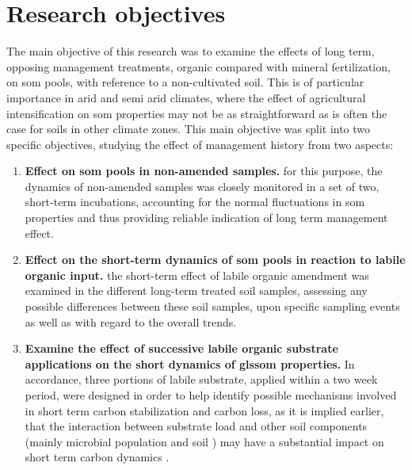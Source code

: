 \section{Research objectives}

	The main objective of this research was to examine the effects of long term, opposing management treatments, organic compared with mineral fertilization, on \gls{som} pools,  with reference to a non-cultivated soil. This is of particular importance in arid and semi arid climates, where the effect of agricultural intensification on \gls{som} properties may not be as straightforward as is often the case for soils in other climate zones.
	This main objective was split into two specific objectives, studying the effect of management history from two aspects:
	\begin{enumerate}
		\item \textbf{Effect on \gls{som} pools in non-amended samples.} for this purpose, the dynamics of non-amended samples was closely monitored in a set of two, short-term incubations, accounting for the normal fluctuations in \gls{som} properties and thus providing reliable indication of long term management effect.
		\item \textbf{Effect on the short-term dynamics of \gls{som} pools in reaction to labile organic input.} the short-term effect of labile organic amendment was examined in the different long-term treated soil samples, assessing any possible differences between these soil samples, upon specific sampling events as well as with regard to the overall trends.


		\item \textbf{Examine the effect of successive labile organic substrate applications on the short dynamics of gls{som} properties.} In accordance, three portions of labile substrate, applied within a two week period, were designed in  order to help identify possible mechanisms involved in short term carbon stabilization and carbon loss, as it is implied earlier, that the interaction between substrate load and other soil components (mainly microbial population and soil
		) may have a substantial impact on short term carbon dynamics .
	\end{enumerate}
